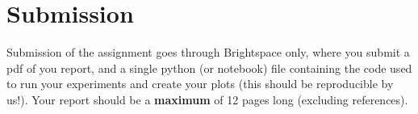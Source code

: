 \documentclass[runningheads]{llncs}
\begin{document}
\section{Submission}\label{app:submission}
Submission of the assignment goes through Brightspace only, where you submit a pdf of you report, and a single python (or notebook) file containing the code used to run your experiments and create your plots (this should be reproducible by us!). Your report should be a \textbf{maximum} of 12 pages long (excluding references). 
\end{document}
